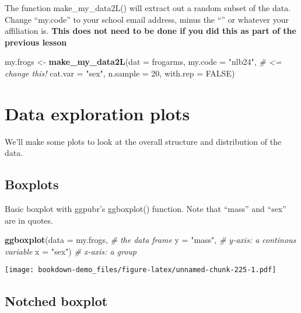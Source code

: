\documentclass[]{book}
\newenvironment{Shaded}{\begin{snugshade}}{\end{snugshade}}
\newcommand{\KeywordTok}[1]{\textcolor[rgb]{0.13,0.29,0.53}{\textbf{#1}}}
\newcommand{\DataTypeTok}[1]{\textcolor[rgb]{0.13,0.29,0.53}{#1}}
\newcommand{\DecValTok}[1]{\textcolor[rgb]{0.00,0.00,0.81}{#1}}
\newcommand{\StringTok}[1]{\textcolor[rgb]{0.31,0.60,0.02}{#1}}
\newcommand{\CommentTok}[1]{\textcolor[rgb]{0.56,0.35,0.01}{\textit{#1}}}
\newcommand{\OtherTok}[1]{\textcolor[rgb]{0.56,0.35,0.01}{#1}}
\newcommand{\NormalTok}[1]{#1}
\theoremstyle{definition}
\theoremstyle{definition}
\theoremstyle{definition}
\theoremstyle{remark}
\begin{document}
The function make\_my\_data2L() will extract out a random subset of the
data. Change ``my.code'' to your school email address, minus the
``\citet{pitt.edu}'' or whatever your affiliation is. \textbf{This does
not need to be done if you did this as part of the previous lesson}

\begin{Shaded}
\begin{Highlighting}[]
\NormalTok{my.frogs <-}\StringTok{ }\KeywordTok{make_my_data2L}\NormalTok{(}\DataTypeTok{dat =}\NormalTok{ frogarms, }
                           \DataTypeTok{my.code =} \StringTok{"nlb24"}\NormalTok{, }\CommentTok{# <=  change this!}
                           \DataTypeTok{cat.var =} \StringTok{"sex"}\NormalTok{,}
                           \DataTypeTok{n.sample =} \DecValTok{20}\NormalTok{, }
                           \DataTypeTok{with.rep =} \OtherTok{FALSE}\NormalTok{)}
\end{Highlighting}
\end{Shaded}

\section{Data exploration plots}\label{data-exploration-plots}

We'll make some plots to look at the overall structure and distribution
of the data.

\subsection{Boxplots}\label{boxplots}

Basic boxplot with ggpubr's ggboxplot() function. Note that ``mass'' and
``sex'' are in quotes.

\begin{Shaded}
\begin{Highlighting}[]
\KeywordTok{ggboxplot}\NormalTok{(}\DataTypeTok{data =}\NormalTok{ my.frogs, }\CommentTok{# the data frame}
          \DataTypeTok{y =} \StringTok{"mass"}\NormalTok{,      }\CommentTok{# y-axis: a continous variable}
          \DataTypeTok{x =} \StringTok{"sex"}\NormalTok{)       }\CommentTok{# x-axis: a group}
\end{Highlighting}
\end{Shaded}

\texttt{[image: bookdown-demo\_files/figure-latex/unnamed-chunk-225-1.pdf]}

\subsection{Notched boxplot}\label{notched-boxplot}
\end{document}
